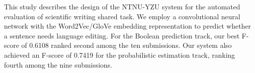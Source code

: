 This study describes the design of the NTNU-YZU system for the automated evaluation of scientific writing shared task. We employ a convolutional neural network with the Word2Vec/GloVe embedding representation to predict whether a sentence needs language editing. For the Boolean prediction track, our best F-score of 0.6108 ranked second among the ten submissions. Our system also achieved an F-score of 0.7419 for the probabilistic estimation track, ranking fourth among the nine submissions.
